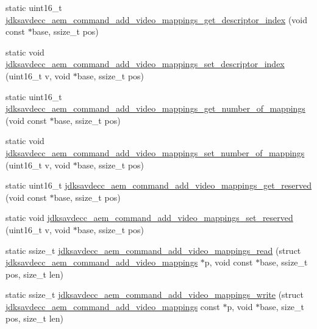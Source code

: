 \begin{DoxyCompactItemize}
\item 
static uint16\+\_\+t \hyperlink{group__command__add__video__mappings_ga316f8320076daad302b46eeb0f2051eb}{jdksavdecc\+\_\+aem\+\_\+command\+\_\+add\+\_\+video\+\_\+mappings\+\_\+get\+\_\+descriptor\+\_\+index} (void const $\ast$base, ssize\+\_\+t pos)
\item 
static void \hyperlink{group__command__add__video__mappings_ga6f6dff17eadc720dcc10cc37bcf80abe}{jdksavdecc\+\_\+aem\+\_\+command\+\_\+add\+\_\+video\+\_\+mappings\+\_\+set\+\_\+descriptor\+\_\+index} (uint16\+\_\+t v, void $\ast$base, ssize\+\_\+t pos)
\item 
static uint16\+\_\+t \hyperlink{group__command__add__video__mappings_gad515e616aa1754d43e1d6f4c4a5c5b73}{jdksavdecc\+\_\+aem\+\_\+command\+\_\+add\+\_\+video\+\_\+mappings\+\_\+get\+\_\+number\+\_\+of\+\_\+mappings} (void const $\ast$base, ssize\+\_\+t pos)
\item 
static void \hyperlink{group__command__add__video__mappings_gadca256d366e61d0686f03ffe3572ad3c}{jdksavdecc\+\_\+aem\+\_\+command\+\_\+add\+\_\+video\+\_\+mappings\+\_\+set\+\_\+number\+\_\+of\+\_\+mappings} (uint16\+\_\+t v, void $\ast$base, ssize\+\_\+t pos)
\item 
static uint16\+\_\+t \hyperlink{group__command__add__video__mappings_gafecdc9936cc6a59840e925b43918275a}{jdksavdecc\+\_\+aem\+\_\+command\+\_\+add\+\_\+video\+\_\+mappings\+\_\+get\+\_\+reserved} (void const $\ast$base, ssize\+\_\+t pos)
\item 
static void \hyperlink{group__command__add__video__mappings_ga8a9f2fe99468d5e46fdcbe7c4c8b06db}{jdksavdecc\+\_\+aem\+\_\+command\+\_\+add\+\_\+video\+\_\+mappings\+\_\+set\+\_\+reserved} (uint16\+\_\+t v, void $\ast$base, ssize\+\_\+t pos)
\item 
static ssize\+\_\+t \hyperlink{group__command__add__video__mappings_ga8006f4a0e6ea11e324896c770020c85f}{jdksavdecc\+\_\+aem\+\_\+command\+\_\+add\+\_\+video\+\_\+mappings\+\_\+read} (struct \hyperlink{structjdksavdecc__aem__command__add__video__mappings}{jdksavdecc\+\_\+aem\+\_\+command\+\_\+add\+\_\+video\+\_\+mappings} $\ast$p, void const $\ast$base, ssize\+\_\+t pos, size\+\_\+t len)
\item 
static ssize\+\_\+t \hyperlink{group__command__add__video__mappings_ga1bd31714358845eaab8257a655079d46}{jdksavdecc\+\_\+aem\+\_\+command\+\_\+add\+\_\+video\+\_\+mappings\+\_\+write} (struct \hyperlink{structjdksavdecc__aem__command__add__video__mappings}{jdksavdecc\+\_\+aem\+\_\+command\+\_\+add\+\_\+video\+\_\+mappings} const $\ast$p, void $\ast$base, size\+\_\+t pos, size\+\_\+t len)
\end{DoxyCompactItemize}


